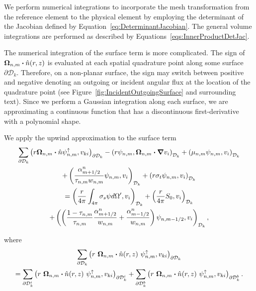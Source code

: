 \documentclass[12pt]{article}
\begin{document}
We perform numerical integrations to incorporate the mesh transformation from the reference element to the physical element by employing the determinant of the Jacobian defined by Equation~\ref{eq:DeterminantJacobian}. The general volume integrations are performed as described by Equations~\ref{eqs:InnerProductDetJac}.

The numerical integration of the surface term is more complicated. The sign of $\bm{\Omega}_{n,m} \bm{\cdot} \hat{n}(r,z)$ is evaluated at each spatial quadrature point along some surface $\partial \mathcal{D}_k$. Therefore, on a non-planar surface, the sign may switch between positive and negative denoting an outgoing or incident angular flux at the location of the quadrature point (see Figure~\ref{fig:IncidentOutgoingSurface} and surrounding text). Since we perform a Gaussian integration along each surface, we are approximating a continuous function that has a discontinuous first-derivative with a polynomial shape.

We apply the upwind approximation to the surface term
\begin{multline}
\sum_{\partial \mathcal{D}_k} \left(r \bm{\Omega}_{n,m} \bm{\cdot} \hat{n} \psi_{n,m}^\uparrow, v_{ki} \right)_{\partial \mathcal{D}_k} - \left(r \psi_{n,m}, \bm{\Omega}_{n,m} \bm{\cdot} \bm{\nabla} v_i \right)_{\mathcal{D}_k} + \left(\mu_{n,m} \psi_{n,m}, v_i \right)_{\mathcal{D}_k} \\
+ \left(\frac{\alpha_{m+1/2}^n}{\tau_{n,m} w_{n,m}} \psi_{n,m}, v_i \right)_{\mathcal{D}_k} + \left(r \sigma_t\psi_{n,m}, v_i \right)_{\mathcal{D}_k} \\
= \left(\frac{r}{4 \pi} \int_{4 \pi} \sigma_s \psi d \Omega^\prime, v_i \right)_{\mathcal{D}_k} + \left(\frac{r}{4 \pi} S_0, v_i \right)_{\mathcal{D}_k} \\
+ \left(\left(\frac{1-\tau_{n,m}}{\tau_{n,m}} \frac{\alpha_{m+1/2}^n}{w_{n,m}} + \frac{\alpha_{m-1/2}^n}{w_{n,m}} \right) \psi_{n,m-1/2}, v_i \right)_{\mathcal{D}_k},
\end{multline}

\noindent where
\begin{multline}
\sum_{\partial \mathcal{D}_k} \left(r\ \vec{\Omega}_{n,m} \vd \hat{n}(r,z)\ \psi_{n,m}^\uparrow, v_{ki} \right)_{\partial \mathcal{D}_k} \\
= \sum_{\partial \mathcal{D}_k^i} \left(r\ \vec{\Omega}_{n,m} \vd \hat{n}(r,z)\ \psi_{n,m}^\uparrow, v_{ki} \right)_{\partial \mathcal{D}_k^i} + \sum_{\partial \mathcal{D}_k^b} \left(r\ \vec{\Omega}_{n,m} \vd \hat{n}(r,z)\ \psi_{n,m}^\uparrow, v_{ki} \right)_{\partial \mathcal{D}_k^b}.
\end{multline}
\end{document}
